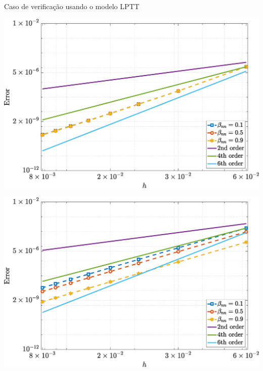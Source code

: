 \begin{frame}{Caso de verificação usando o modelo LPTT}
    \centering
    \captionsetup{justification=centering}
    \label{fig:lptt_3}
    \begin{minipage}{0.325\textwidth}
        \centering
        \includegraphics[width=\textwidth]{Figures/NormErr_2nd_Re_100_Wi_1_epsilon_0_xi_0_alphaG_0_Dt_1e-06_at_0.05_tipsim_1_MMS_12_Psi.eps}
        \label{lptt_txx_Case11}
    \end{minipage}
    \hfill
    \begin{minipage}{0.325\textwidth}
        \centering
        \includegraphics[width=\textwidth]{Figures/NormErr_2nd_Re_100_Wi_1_epsilon_0_xi_0_alphaG_0_Dt_1e-06_at_0.05_tipsim_1_MMS_12_Txy.eps}

\end{minipage}
\end{frame}
